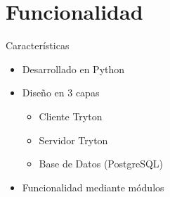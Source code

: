 
\section{Funcionalidad}

    \begin{frame}{Características}
    	\begin{itemize}
    		\item Desarrollado en Python
    		\item Diseño en 3 capas
    			\begin{itemize}
    				\item Cliente Tryton
    				\item Servidor Tryton
    				\item Base de Datos (PostgreSQL)
    			\end{itemize}
    		\item Funcionalidad mediante módulos
    	\end{itemize}
    \end{frame}

